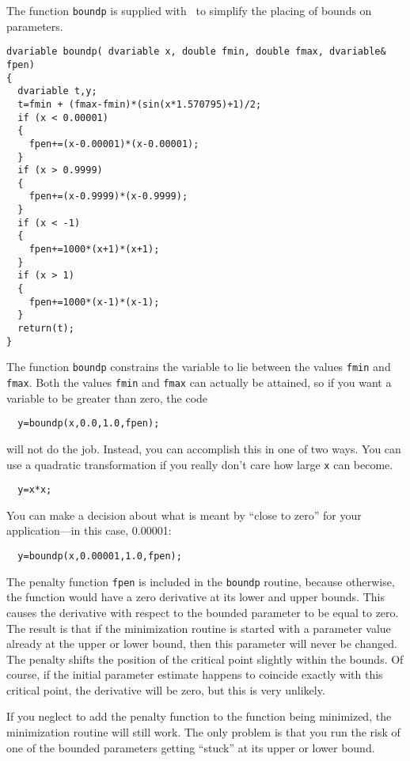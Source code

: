 \documentclass{admbmanual}
\begin{document}
The function \texttt{boundp} is supplied with \scAD\ to simplify the
placing of bounds on parameters.

\begin{lstlisting}
dvariable boundp( dvariable x, double fmin, double fmax, dvariable& fpen)
{
  dvariable t,y;
  t=fmin + (fmax-fmin)*(sin(x*1.570795)+1)/2;
  if (x < 0.00001)
  {
    fpen+=(x-0.00001)*(x-0.00001);
  }
  if (x > 0.9999)
  {
    fpen+=(x-0.9999)*(x-0.9999);
  }
  if (x < -1)
  {
    fpen+=1000*(x+1)*(x+1);
  }
  if (x > 1)
  {
    fpen+=1000*(x-1)*(x-1);
  }
  return(t);
}
\end{lstlisting} 

The function \texttt{boundp} constrains the variable to lie
between the values \texttt{fmin} and \texttt{fmax}. Both the values
\texttt{fmin} and \texttt{fmax} can actually be attained, so if you
want a variable to be greater than zero, the code
\begin{lstlisting}
  y=boundp(x,0.0,1.0,fpen); 
\end{lstlisting}
will not do the job. Instead, you can accomplish this in one of two ways.
You can use a quadratic transformation if you really don't
care how large \texttt{x} can become.
\begin{lstlisting}
  y=x*x; 
\end{lstlisting}
You can make a decision about what is meant by ``close to zero''
for your application---in this case, 0.00001:
\begin{lstlisting}
  y=boundp(x,0.00001,1.0,fpen); 
\end{lstlisting}

The penalty function \texttt{fpen} is included in the \texttt{boundp}
routine, because otherwise, the function would have a zero 
derivative at its lower and upper bounds. This causes the
derivative with respect to the bounded parameter to 
be equal to zero. The result is that if the minimization routine
is started with a parameter value already at the upper or
lower bound, then this parameter will never be changed.
The penalty shifts the position of the critical point
slightly within the bounds. Of course, if the initial parameter
estimate happens to coincide exactly with this critical point, the
derivative will be zero, but this is very unlikely.

If you neglect to add the penalty function to the function
being minimized, the minimization routine will still work.
The only problem is that you run the risk of one of the
bounded parameters getting ``stuck'' at its upper or lower bound.
\end{document}

